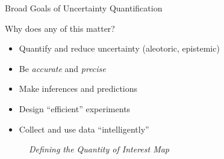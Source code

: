 \begin{frame}[t]{Broad Goals of Uncertainty Quantification}

    Why does any of this matter?

    \begin{itemize}
        \item Quantify and reduce uncertainty (aleotoric, epistemic)
	    \vskip 20pt
	    \item Be \emph{accurate} and \emph{precise}
	    \vskip 20pt
	    \item Make inferences and predictions
	    \vskip 20pt
	    \item Design ``efficient'' experiments
	    \vskip 20pt
	    \item Collect and use data ``intelligently''
    \end{itemize}
    
\end{frame}

\begin{frame}[t]
\centering
\begin{figure}
\centering


\vspace{1em}
\emph{Defining the Quantity of Interest Map}
\end{figure}

\end{frame}


